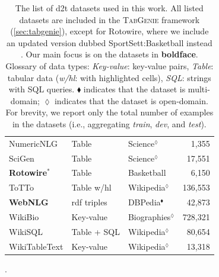{\begin{table}[t]
\begin{tabular}{@{}lllr@{}}
        NumericNLG \cite{suadaaTabletoTextGenerationNumerical2021}                                 & Table                & Science$^\lozenge$      & 1,355                 \\
        SciGen \cite{moosaviLearningReasonText2021}                                                & Table                & Science$^\lozenge$      & 17,551                \\
        \textbf{Rotowire}$^*$ \cite{wiseman2017challenges}                                         & Table                & Basketball              & 6,150                 \\
        ToTTo \cite{parikhToTToControlledTableToText2020}                                          & Table w/hl           & Wikipedia$^\lozenge$    & 136,553               \\
        \textbf{WebNLG} \cite{gardentWebNLGChallengeGenerating2017}                                & \acs{rdf} triples    & DBPedia$^\blacklozenge$ & 42,873                \\
        WikiBio \cite{lebretNeuralTextGeneration2016}                                              & Key-value            & Biographies$^\lozenge$  & 728,321               \\
        WikiSQL \cite{zhong2017seq2sql}                                                            & Table + SQL          & Wikipedia$^\lozenge$    & 80,654                \\
        WikiTableText \cite{bao2018table}                                                          & Key-value            & Wikipedia$^\lozenge$    & 13,318                \\
        \bottomrule
    \end{tabular}
    \caption[The list of data-to-text datasets used in this work.]{The list of \ac{d2t} datasets used in this work. All listed datasets are included in the \textsc{TabGenie} framework (\autoref{sec:tabgenie}), except for Rotowire, where we include an updated version dubbed SportSett:Basketball instead \cite{thomson2020sportsett}. Our main focus is on the datasets in \textbf{boldface}. Glossary of data types: \textit{Key-value}: key-value pairs, \textit{Table}: tabular data (\textit{w/hl}: with highlighted cells),  \textit{SQL}: strings with SQL queries. $\blacklozenge$ indicates that the dataset is multi-domain; $\lozenge$ indicates that the dataset is open-domain. For brevity, we report only the total number of examples in the datasets (i.e., aggregating \emph{train}, \emph{dev}, and \emph{test}).}
    \label{tab:datasets}.
\end{table}

}
